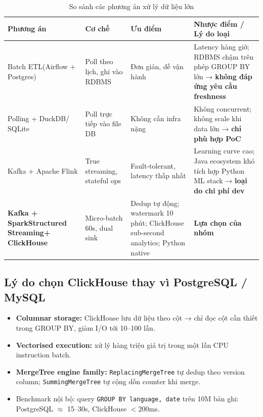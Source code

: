 \documentclass[12pt,a4paper]{article}
\newcommand{\tech}[1]{\texttt{#1}}
\newcommand{\kw}[1]{\textbf{#1}}
\begin{document}
\begin{table}[H]
  \centering
  \caption{So sánh các phương án xử lý dữ liệu lớn}
  \small
  \begin{tabularx}{\linewidth}{p{3.2cm}p{2.8cm}XX}
    \toprule
    \textbf{Phương án} & \textbf{Cơ chế} & \textbf{Ưu điểm} & \textbf{Nhược điểm / Lý do loại} \\
    \midrule
    Batch ETL\newline (Airflow + Postgres)
      & Poll theo lịch, ghi vào RDBMS
      & Đơn giản, dễ vận hành
      & Latency hàng giờ; RDBMS chậm trên phép GROUP BY lớn → \kw{không đáp ứng yêu cầu freshness} \\
    Polling + DuckDB\newline / SQLite
      & Poll trực tiếp vào file DB
      & Không cần infra nặng
      & Không concurrent; không scale khi data lớn → \kw{chỉ phù hợp PoC} \\
    Kafka + Apache Flink
      & True streaming, stateful ops
      & Fault-tolerant, latency thấp nhất
      & Learning curve cao; Java ecosystem khó tích hợp Python ML stack → \kw{loại do chi phí dev} \\
    \rowcolor{accentorange!15}
    \textbf{Kafka + Spark}\newline \textbf{Structured Streaming}\newline \textbf{+ ClickHouse}
      & Micro-batch 60s, dual sink
      & Dedup tự động; watermark 10 phút; ClickHouse sub-second analytics; Python native
      & \kw{Lựa chọn của nhóm} \\
    \bottomrule
  \end{tabularx}
\end{table}

\subsection{Lý do chọn ClickHouse thay vì PostgreSQL / MySQL}

\begin{itemize}[leftmargin=1.5em]
  \item \kw{Columnar storage:} ClickHouse lưu dữ liệu theo cột
        → chỉ đọc cột cần thiết trong GROUP BY, giảm I/O tới 10--100 lần.
  \item \kw{Vectorised execution:} xử lý hàng triệu giá trị trong
        một lần CPU instruction batch.
  \item \kw{MergeTree engine family:}
        \tech{ReplacingMergeTree} tự dedup theo version column;
        \tech{SummingMergeTree} tự cộng dồn counter khi merge.
  \item Benchmark nội bộ: query \texttt{GROUP BY language, date} trên
        10M bản ghi: PostgreSQL $\approx$ 15--30s, ClickHouse $< 200$ms.
\end{itemize}
\end{document}
